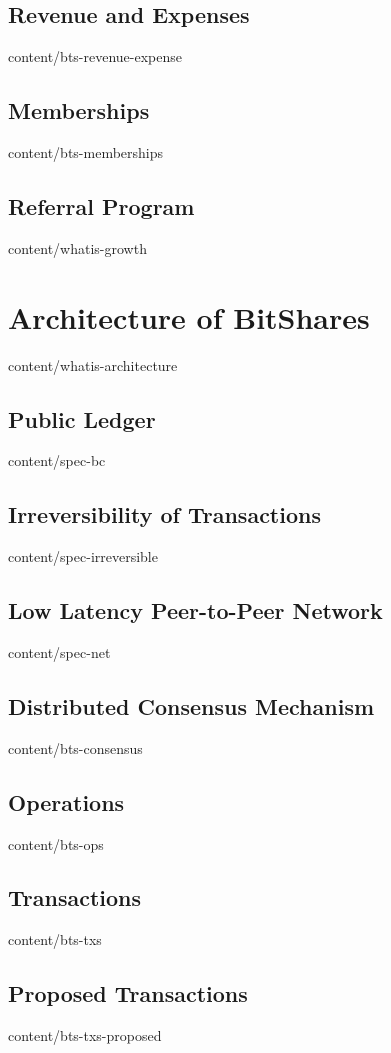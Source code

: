 \documentclass{btswhitepaper}
\begin{document}
\subsection    { Revenue and Expenses              }  { content/bts-revenue-expense }
\subsection    { Memberships                       }  { content/bts-memberships     }
\subsection    { Referral Program                  }  { content/whatis-growth       } 

\section       { Architecture of BitShares         }  { content/whatis-architecture } 
\subsection    { Public Ledger                     }  { content/spec-bc             } 
\subsection    { Irreversibility of Transactions   }  { content/spec-irreversible   }
\subsection    { Low Latency Peer-to-Peer Network  }  { content/spec-net            } 
\subsection    { Distributed Consensus Mechanism   }  { content/bts-consensus       } 
\subsection    { Operations                        }  { content/bts-ops             } 
\subsection    { Transactions                      }  { content/bts-txs             } 
\subsection    { Proposed Transactions             }  { content/bts-txs-proposed    }
\end{document}
